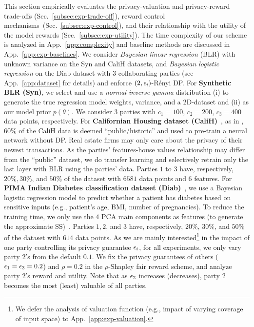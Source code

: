 \documentclass{article}
\DeclareRobustCommand{\hlp}[1]
{{#1}}
\theoremstyle{plain}
\theoremstyle{definition}
\theoremstyle{remark}
\renewcommand{\citet}[1]{\cite{#1}}
\begin{document}
This section empirically evaluates the privacy-valuation and privacy-reward trade-offs (Sec.~\ref{subsec:exp-trade-off}), reward control mechanisms~(Sec.~\ref{subsec:exp-control}), and their relationship with the utility of the model rewards (Sec.~\ref{subsec:exp-utility}).
The time complexity of our scheme is analyzed in 
App.~\ref{app:complexity} and \hlp{baseline methods are discussed in App.~{\ref{app:exp-baselines}}}.
We consider \emph{Bayesian linear regression} (BLR) with unknown variance on the Syn and CaliH datasets, and \emph{Bayesian logistic regression} on the Diab dataset with $3$ collaborating parties (see App.~\ref{app:dataset} for details) and enforce $(2,{\epsilon}_i)$-R{\'e}nyi DP. For 
\textbf{Synthetic BLR (Syn)}, we select and use a \emph{normal inverse-gamma} distribution (i) to generate the true regression model weights, variance, and a $2$D-dataset and (ii) as our model prior $p(\theta)$. We consider $3$ parties with $c_1=100$, $c_2=200$, $c_3=400$ data points, respectively. 
For \textbf{Californian Housing dataset (CaliH)}~\cite{cali-dataset},
as in \cite{simcollaborative}, $60\%$ of the CaliH data is deemed ``public/historic'' and used to pre-train a neural network without DP. Real estate firms may only care about the privacy of their newest transactions.
As the parties' features-house values relationship may differ from the ``public'' dataset, we do transfer learning and selectively retrain only the last layer with BLR using the parties' data. Parties $1$ to $3$ have, respectively, $20\%, 30\%$, and $50\%$ of the dataset with $6581$ data points and $6$ features. 
For \textbf{PIMA Indian Diabetes classification dataset (Diab)}~\cite{smith1988diabetes-dataset},
we use a Bayesian logistic regression model to predict whether a patient has diabetes based on sensitive inputs (e.g., patient's age, BMI, number of pregnancies).
To reduce the training time, we only use the $4$ PCA main components as features (to generate the approximate SS)~\citet{kulkarni2021glm}. Parties $1, 2$, and $3$ have, respectively, $20\%$, $30\%$, and $50\%$ of the dataset with $614$ data points.
As we are mainly interested\footnote{We defer the  analysis of valuation function (e.g., impact of varying coverage of input space) to App.~\ref{app:exp-valuation}.} in the impact of one party controlling its privacy guarantee ${\epsilon}_i$, for all experiments, we only vary party $2$'s from the default $0.1$.
We fix the privacy guarantees of others (${\epsilon}_1 = {\epsilon}_3 = 0.2$) and $\rho=0.2$ in the $\rho$-Shapley fair reward scheme,
and analyze party $2$'s reward and utility. Note that as ${\epsilon}_2$ increases (decreases), party $2$ becomes the most (least) valuable of all parties.
\end{document}
